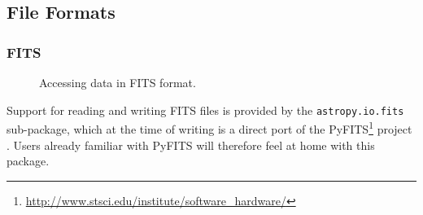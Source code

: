 \documentclass[traditabstract]{aa}
\begin{document}
\subsection{File Formats}

\label{sec:io}

\subsubsection{FITS}


\label{sec:fits}

\begin{figure}
\center
\caption{Accessing data in FITS format.\label{code:fits}}
\vspace{0.1in}
\end{figure}

Support for reading and writing FITS files is provided by the
\texttt{astropy.io.fits} sub-package, which at the time of writing is a direct
port of the
PyFITS\footnote{\url{http://www.stsci.edu/institute/software_hardware/}}
project \citep{barrett1999pyfits}. Users already familiar with PyFITS will
therefore feel at home with this package.
\end{document}

